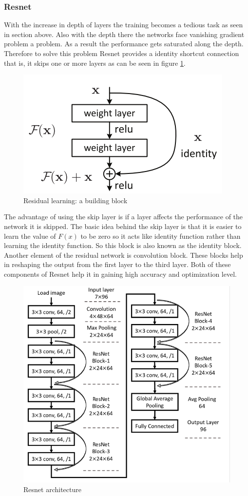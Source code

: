  \subsubsection{Resnet}
 With the increase in depth of layers the training becomes a tedious task as seen in section above. Also with the depth there the networks face vanishing gradient problem a problem. As a result the performance gets saturated along the depth. Therefore to solve this problem Resnet provides a identity shortcut connection that is, it skips one or more layers as can be seen in figure \ref{ll}. 
      \begin{figure}[h]
      	\centering
      	\includegraphics[width=0.5\linewidth]{images/resd.png}
      	\caption{Residual learning: a building block \cite{he2016deep}}
      	\label{ll}	
      \end{figure}
     
            
The advantage of using the skip layer is if a layer affects the performance of the network it is skipped. The basic idea behind the skip layer is that it is easier to learn the value of $F(x)$  to be zero so it acts like identity function rather than learning the identity function. So this block is also known as the identity block.
Another element of the residual network is convolution block.  These blocks help in reshaping the output from the first layer to the third layer. Both of these components of Resnet help it in gaining high accuracy and optimization level. 

       \begin{figure}[h]
       	\centering
       	\includegraphics[width=0.5\linewidth]{images/rs.png}
       	\caption{Resnet architecture \cite{inproceedings}}
       	\label{ll1}	
       \end{figure}


